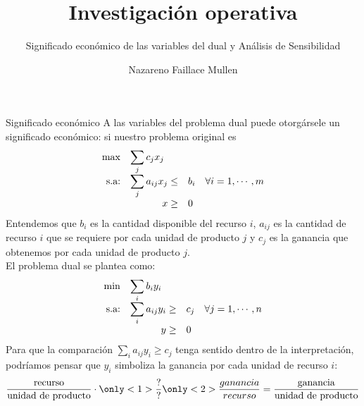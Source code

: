 \documentclass[10pt, aspectratio=169]{beamer}
\title{Investigación operativa}
\subtitle{Significado económico de las variables del dual y Análisis de Sensibilidad}
\date{}
\author{Nazareno Faillace Mullen}
\institute{Departamento de Matemática - FCEN - UBA}
\begin{document}
\maketitle


\begin{frame}{Significado económico}
    \fontsize{8.5pt}{2pt}\selectfont
    A las variables del problema dual puede otorgársele un significado económico: si nuestro problema original es
    \[\begin{array}{rrl}
        \max & \multicolumn{2}{l}{\displaystyle \sum_j c_jx_j} \\
        \text{s.a:} & \displaystyle \sum_j a_{ij}x_j \leq& b_i \quad \forall i=1,\cdots,m \\
         & x \geq& 0
    \end{array}
    \]
    Entendemos que $b_i$ es la cantidad disponible del recurso $i$, $a_{ij}$ es la cantidad de recurso $i$ que se requiere por cada unidad de producto $j$ y $c_j$ es la ganancia que obtenemos por cada unidad de producto $j$.\\
    El problema dual se plantea como:
    \[\begin{array}{rrl}
        \min & \multicolumn{2}{l}{\displaystyle \sum_i b_iy_i} \\
        \text{s.a:} & \displaystyle \sum_i a_{ij}y_i \geq& c_j \quad \forall j=1,\cdots,n \\
         & y \geq& 0
    \end{array}
    \]
    Para que la comparación $\displaystyle \sum_i a_{ij}y_i \geq c_j$ tenga sentido dentro de la interpretación, podríamos pensar que $y_i$ simboliza la ganancia por cada unidad de recurso $i$:
    \[ \frac{\text{recurso}}{\text{unidad de producto}}\cdot \only<1>{\frac{?}{?}} \only<2>{\frac{ganancia}{recurso}} = \frac{\text{ganancia}}{\text{unidad de producto}} \]
\end{frame}
\end{document}
